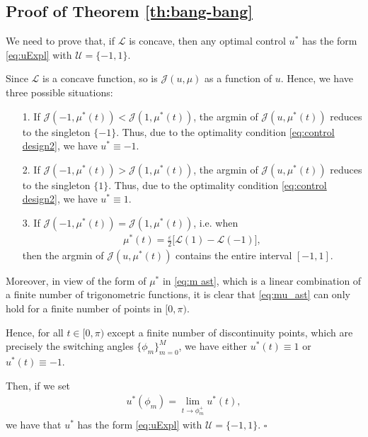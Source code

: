 \documentclass[twocolumn]{autart}    %
\begin{document}
\subsection{Proof of Theorem \ref{th:bang-bang}}\label{proof:bang-bang}

We need to prove that, if $\mathcal{L}$ is concave, then any optimal control $u^\ast$ has the form \eqref{eq:uExpl} with $\mathcal{U}=\{-1,1\}$. 

Since $\mathcal{L}$ is a concave function, so is $\mathcal{J}(u,\mu)$ as a function of $u$. Hence, we have three possible situations:
\begin{itemize}
	\item[1.] If $\mathcal{J}(-1,\mu^\ast(t)) <  \mathcal{J}(1,\mu^\ast(t))$, the argmin of $\mathcal{J} (u,\mu^\ast(t))$ reduces to the singleton $\{-1\}$. Thus, due to the optimality condition \eqref{eq:control design2}, we have $u^\ast\equiv -1$.
	
	\vspace{0.2cm}
	\item[2.] If $\mathcal{J}(-1,\mu^\ast(t)) >  \mathcal{J}(1,\mu^\ast(t))$, the argmin of $\mathcal{J} (u,\mu^\ast(t))$ reduces to the singleton $\{1\}$. Thus, due to the optimality condition \eqref{eq:control design2}, we have $u^\ast\equiv 1$.
	\vspace{0.2cm}
	\item[3.] If $\mathcal{J}(-1,\mu^\ast(t)) =  \mathcal{J}(1,\mu^\ast(t))$, i.e. when 
	\begin{align}\label{eq:mu_ast}
		\mu^\ast (t) = \frac{\varepsilon}{2} \Big[\mathcal{L}(1) - \mathcal{L}(-1)\Big],
	\end{align}
	then the argmin of $\mathcal{J}(u,\mu^\ast(t))$ contains the entire interval $[-1,1]$.
\end{itemize}

Moreover, in view of the form of $\mu^\ast$ in \eqref{eq:m ast}, which is a linear combination of a finite number of trigonometric functions, it is clear that \eqref{eq:mu_ast} can only hold for a finite number of points in $[0,\pi)$. 

Hence, for all $t\in [0,\pi)$ except a finite number of discontinuity points, which are precisely the switching angles $\{\phi_m\}_{m=0}^M$, we have either $u^\ast(t)\equiv 1$ or $u^\ast(t)\equiv -1$. 

Then, if we set
\begin{align*}
	u^\ast(\phi_m) = \lim_{t\to\phi_m^+} u^\ast(t),
\end{align*}
we have that $u^\ast$ has the form \eqref{eq:uExpl} with $\mathcal U=\{-1,1\}$. \hfill $\square$
\end{document}
